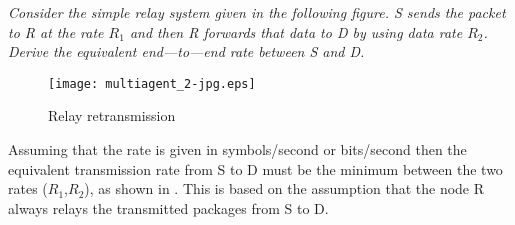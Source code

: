 \textit{ Consider the simple relay system given in the following figure. S sends the packet 
to R at the rate $R_1$ and then R forwards that data to D by using data rate $R_2$. Derive the 
equivalent end—to—end rate between S and D. }

\begin{figure}[!h]
  \centering
  \texttt{[image: multiagent\_2-jpg.eps]}
  \caption{Relay retransmission}
  \label{fig:multiagent_2-jpg}
\end{figure}

Assuming that the rate is given in symbols/second or bits/second then the equivalent transmission rate from S to D must be the minimum between the two rates ($R_1$,$R_2$), as shown in . This is based on the assumption that the node R always relays the transmitted packages from S to D.